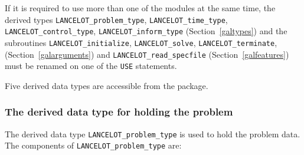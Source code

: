 \documentclass{galahad}
\newcommand{\fullpackagename}{LANC\-E\-LOT}
\begin{document}

\galhowto



\noindent
If it is required to use more than one of the modules at the same time, 
the derived types
{\tt \fullpackagename\_problem\_type},
{\tt \fullpackagename\_\-time\_type},
{\tt \fullpackagename\_control\_type},
{\tt \fullpackagename\_inform\_type}
(Section~\ref{galtypes})
and the subroutines
{\tt \fullpackagename\_init\-ialize},
{\tt \fullpackagename\_\-solve},
{\tt \fullpackagename\_terminate},
(Section~\ref{galarguments})
and
{\tt \fullpackagename\_read\_specfile}
(Section~\ref{galfeatures})
must be renamed on one of the {\tt USE} statements.





\galtypes
Five derived data types are accessible from the package.


\subsubsection{The derived data type for holding the problem}\label{typeprob}
The derived data type {\tt \fullpackagename\_problem\_type} is used to hold
the problem data. The components of
{\tt \fullpackagename\_problem\_type}
are:
\end{document}
